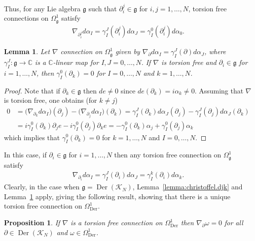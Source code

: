 \documentclass{amsart}
\newcommand{\complex}{\mathbb{C}}
\newcommand{\paraa}[1]{\big(#1\big)}
\newtheorem{lemma}[theorem]{Lemma}
\newtheorem{proposition}[theorem]{Proposition}
\theoremstyle{definition}
\theoremstyle{remark}
\numberwithin{equation}{section}
\newcommand{\K}{\mathcal{K}}
\newcommand{\KN}{\K_N}
\renewcommand{\d}{\partial}
\newcommand{\Der}{\operatorname{Der}}
\newcommand{\g}{\mathfrak{g}}
\newcommand{\Omegaoneg}{\Omega^1_{\g}}
\begin{document}
\noindent
Thus, for any Lie algebra $\g$ such that $\d_i^j\in\g$ for
$i,j=1,\ldots,N$, torsion free connections on $\Omegaoneg$ satisfy
\begin{align*}
  \nabla_{\d_i^j}d\alpha_I = \gamma_{I}^J(\d_i^j)d\alpha_J
  = \gamma_{I}^0(\d_i^j)d\alpha_0.
\end{align*}

\begin{lemma}\label{lemma:christoffel.dk}
  Let $\nabla$ connection on $\Omegaoneg$ given by
  $\nabla_{\d}d\alpha_I=\gamma_I^J(\d)d\alpha_J$, where
  $\gamma_{I}^J:\g\to\complex$ is a $\complex$-linear map for
  $I,J=0,\ldots,N$. If $\nabla$ is torsion free and $\d_i\in\g$ for
  $i=1,\ldots,N$, then $\gamma_I^0(\d_k)=0$ for $I=0,\ldots,N$ and
  $k=1,\ldots,N$.
\end{lemma}

\begin{proof}
  Note that if $\d_k\in\g$ then $de\neq 0$ since
  $de(\d_k)=i\alpha_k\neq 0$. Assuming that $\nabla$ is torsion free,
  one obtains (for $k\neq j$)
  \begin{align*}
    0 &= \paraa{\nabla_{\d_k}d\alpha_I}(\d_j)-\paraa{\nabla_{\d_j}d\alpha_I}(\d_k)
        = \gamma_I^J(\d_k)d\alpha_J(\d_j)
        -\gamma_I^J(\d_j)d\alpha_J(\d_k)\\
      &= i\gamma_I^0(\d_k)\d_je - i\gamma_I^0(\d_j)\d_ke
        = -\gamma_I^0(\d_k)\alpha_j + \gamma_I^0(\d_j)\alpha_k
  \end{align*}
  which implies that $\gamma_I^0(\d_k)=0$ for $k=1,\ldots,N$ and
  $I=0,\ldots,N$.
\end{proof}

\noindent
In this case, if $\d_i\in\g$ for $i=1,\ldots,N$ then any torsion free
connection on $\Omegaoneg$ satisfy
\begin{align*}
  \nabla_{\d_i}d\alpha_I = \gamma_I^J(\d_i)d\alpha_J
  =\gamma_I^k(\d_i)d\alpha_k.
\end{align*}
Clearly, in the case when $\g=\Der(\KN)$,
Lemma~\ref{lemma:christoffel.djk} and Lemma~\ref{lemma:christoffel.dk}
apply, giving the following result, showing that there is a unique torsion free
connection on $\Omega^1_{\Der}$.

\begin{proposition}\label{prop:torsion.free.on.OmegaDer}
  If $\nabla$ is a torsion free connection on $\Omega_{\Der}^1$
  then $\nabla_{\d}\omega=0$ for all $\d\in\Der(\KN)$ and
  $\omega\in\Omega_{\Der}^1$.
\end{proposition}
\end{document}
